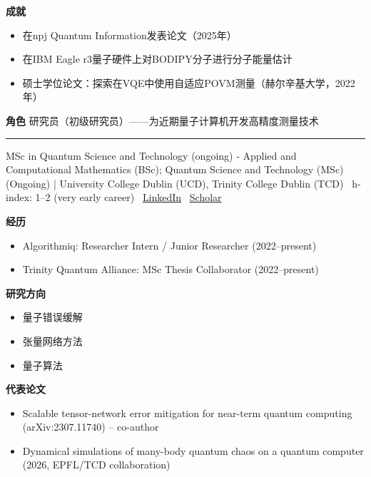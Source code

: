 \par{\footnotesize\color{mainred}\textbf{成就}}
\begin{itemize}[leftmargin=1.2em,itemsep=0pt,topsep=0pt]
\item {\footnotesize 在npj Quantum Information发表论文（2025年）}
\item {\footnotesize 在IBM Eagle r3量子硬件上对BODIPY分子进行分子能量估计}
\item {\footnotesize 硕士学位论文：探索在VQE中使用自适应POVM测量（赫尔辛基大学，2022年）}
\end{itemize}
\par{\footnotesize\color{mainred}\textbf{角色}} {\footnotesize 研究员（初级研究员）——为近期量子计算机开发高精度测量技术}
\vspace{2pt}\hrule\vspace{2pt}
\vspace{4pt}
\par{\footnotesize\color{graytext}MSc in Quantum Science and Technology (ongoing) - Applied and Computational Mathematics (BSc); Quantum Science and Technology (MSc) (Ongoing) | University College Dublin (UCD), Trinity College Dublin (TCD) \textbar\  h-index: 1–2 (very early career) \textbar\  \href{https://www.linkedin.com/in/matea-l-075993100/}{LinkedIn} \textbar\  \href{Not publicly found}{Scholar}}
\par{\footnotesize\color{mainred}\textbf{经历}}
\begin{itemize}[leftmargin=1.2em,itemsep=0pt,topsep=0pt]
\item {\footnotesize Algorithmiq: Researcher Intern / Junior Researcher (2022–present)}
\item {\footnotesize Trinity Quantum Alliance: MSc Thesis Collaborator (2022–present)}
\end{itemize}
\par{\footnotesize\color{mainred}\textbf{研究方向}}
\begin{itemize}[leftmargin=1.2em,itemsep=0pt,topsep=0pt]
\item {\footnotesize 量子错误缓解}
\item {\footnotesize 张量网络方法}
\item {\footnotesize 量子算法}
\end{itemize}
\par{\footnotesize\color{mainred}\textbf{代表论文}}
\begin{itemize}[leftmargin=1.2em,itemsep=0pt,topsep=0pt]
\item {\footnotesize Scalable tensor-network error mitigation for near-term quantum computing (arXiv:2307.11740) -- co-author}
\item {\footnotesize Dynamical simulations of many-body quantum chaos on a quantum computer (2026, EPFL/TCD collaboration)}
\end{itemize}
